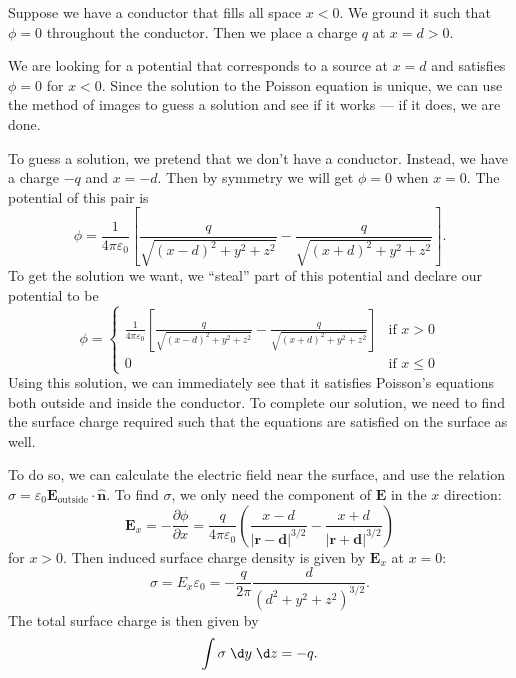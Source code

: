 \documentclass[a4paper]{article}
\begin{document}
\begin{eg}
  Suppose we have a conductor that fills all space $x < 0$. We ground it such that $\phi = 0$ throughout the conductor. Then we place a charge $q$ at $x = d > 0$.
  \begin{center}
  \end{center}
  We are looking for a potential that corresponds to a source at $x = d$ and satisfies $\phi = 0$ for $x < 0$. Since the solution to the Poisson equation is unique, we can use the method of images to guess a solution and see if it works --- if it does, we are done.

  To guess a solution, we pretend that we don't have a conductor. Instead, we have a charge $-q$ and $x = -d$. Then by symmetry we will get $\phi = 0$ when $x = 0$. The potential of this pair is
  \[
    \phi = \frac{1}{4\pi\varepsilon_0}\left[\frac{q}{\sqrt{(x - d)^2 + y^2 + z^2}} - \frac{q}{\sqrt{(x + d)^2 + y^2 + z^2}}\right].
  \]
  To get the solution we want, we ``steal'' part of this potential and declare our potential to be
  \[
    \phi =
    \begin{cases}
      \frac{1}{4\pi\varepsilon_0}\left[\frac{q}{\sqrt{(x - d)^2 + y^2 + z^2}} - \frac{q}{\sqrt{(x + d)^2 + y^2 + z^2}}\right] & \text{if }x > 0\\
    0 & \text{if }x \leq 0
    \end{cases}
  \]
  Using this solution, we can immediately see that it satisfies Poisson's equations both outside and inside the conductor. To complete our solution, we need to find the surface charge required such that the equations are satisfied on the surface as well.

  To do so, we can calculate the electric field near the surface, and use the relation $\sigma = \varepsilon_0 \mathbf{E}_\text{outside}\cdot \hat{\mathbf{n}}$. To find $\sigma$, we only need the component of $\mathbf{E}$ in the $x$ direction:
  \[
    \mathbf{E}_x = -\frac{\partial \phi}{\partial x} = \frac{q}{4\pi\varepsilon_0}\left(\frac{x - d}{|\mathbf{r} - \mathbf{d}|^{3/2}} - \frac{x + d}{|\mathbf{r} + \mathbf{d}|^{3/2}}\right)
  \]
  for $x > 0$. Then induced surface charge density is given by $\mathbf{E}_x$ at $x = 0$:
  \[
    \sigma = E_x\varepsilon_0 = -\frac{q}{2\pi}\frac{d}{(d^2 + y^2 + z^2)^{3/2}}.
  \]
  The total surface charge is then given by
  \[
    \int \sigma \;\d y\;\d z = -q.
  \]
\end{eg}
\end{document}

